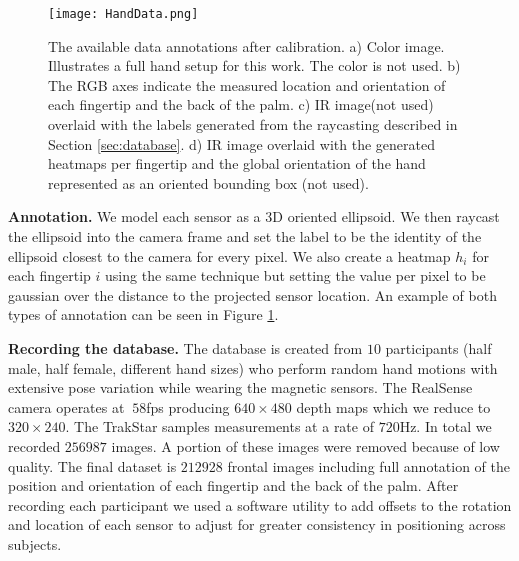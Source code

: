 \documentclass{bmvc2k}
\begin{document}
\begin{figure}[t]
\begin{center}
\texttt{[image: HandData.png]}
\end{center}
   \caption{\scriptsize \color{blue} The available data annotations after calibration. a) Color image. Illustrates a full hand setup for this work. The color is not used. b) The RGB axes indicate the measured location and orientation of each fingertip and the back of the palm. c) IR image(not used) overlaid with the labels generated from the raycasting described in Section \ref{sec:database}. d) IR image overlaid with the generated heatmaps per fingertip and the global orientation of the hand represented as an oriented bounding box (not used).  }
\label{fig:annotation}
\end{figure}

\textbf{Annotation.} We model each sensor as a 3D oriented ellipsoid. We then raycast the ellipsoid into the camera frame and set the label to be the identity of the ellipsoid closest to the camera for every pixel. We also create a heatmap $h_i$ for each fingertip $i$ using the same technique but setting the value per pixel to be gaussian over the distance to the projected sensor location. An example of both types of annotation can be seen in Figure \ref{fig:annotation}.

\textbf{Recording the database.}
The database is created from $10$ participants (half male, half female, different hand sizes) who perform random hand motions with extensive pose variation while wearing the magnetic sensors. The RealSense camera operates at $~58$fps producing $640\times 480$ depth maps which we reduce to $320\times 240$. The TrakStar samples measurements at a rate of $720$Hz. In total we recorded $256987$ images. A portion of these images were removed because of low quality. The final dataset is $212928$ frontal images including full annotation of the position and orientation of each fingertip and the back of the palm. After recording each participant we used a software utility to add offsets to the rotation and location of each sensor to adjust for greater consistency in positioning across subjects.
\end{document}
